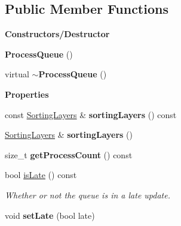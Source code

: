 \subsection*{Public Member Functions}
\begin{Indent}\textbf{ Constructors/\+Destructor}\par
\begin{DoxyCompactItemize}
\item 
\mbox{\label{classrev_1_1_process_queue_a9d2bf7e6029d7505a33718dcf8a143b6}} 
{\bfseries Process\+Queue} ()
\item 
\mbox{\label{classrev_1_1_process_queue_a82a5017fa353c29b6d51c47581b2c33f}} 
virtual {\bfseries $\sim$\+Process\+Queue} ()
\end{DoxyCompactItemize}
\end{Indent}
\begin{Indent}\textbf{ Properties}\par
\begin{DoxyCompactItemize}
\item 
\mbox{\label{classrev_1_1_process_queue_a0624a4d2787e888e3033f3d41ea3cfdc}} 
const \mbox{\hyperlink{structrev_1_1_sorting_layers}{Sorting\+Layers}} \& {\bfseries sorting\+Layers} () const
\item 
\mbox{\label{classrev_1_1_process_queue_aefb3c613348ef53d8c2087bb4169ee21}} 
\mbox{\hyperlink{structrev_1_1_sorting_layers}{Sorting\+Layers}} \& {\bfseries sorting\+Layers} ()
\item 
\mbox{\label{classrev_1_1_process_queue_a00b551aea7b767006b4da241a3124cec}} 
size\+\_\+t {\bfseries get\+Process\+Count} () const
\item 
\mbox{\label{classrev_1_1_process_queue_ab456619639522343d6d67013d31a8e48}} 
bool \mbox{\hyperlink{classrev_1_1_process_queue_ab456619639522343d6d67013d31a8e48}{is\+Late}} () const
\begin{DoxyCompactList}\small\item\em Whether or not the queue is in a late update. \end{DoxyCompactList}\item 
\mbox{\label{classrev_1_1_process_queue_a4133f6ad3935f23579fc0d7f35e7c553}} 
void {\bfseries set\+Late} (bool late)
\end{DoxyCompactItemize}
\end{Indent}

